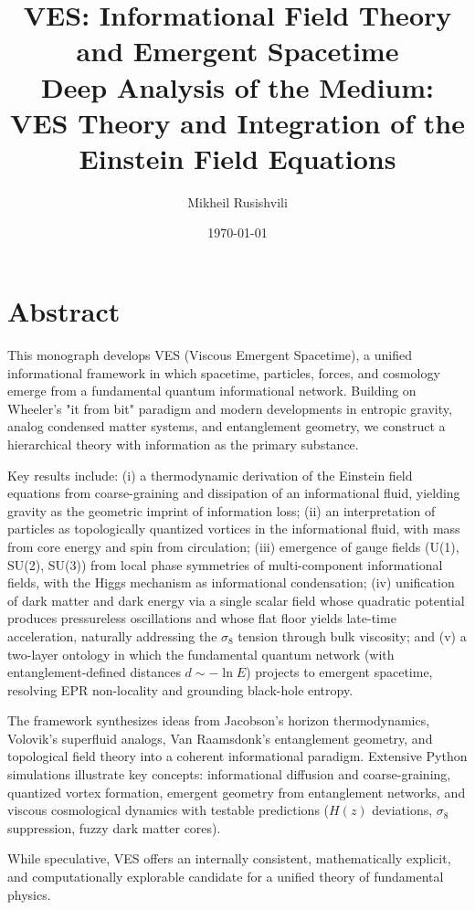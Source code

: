\documentclass[12pt,a4paper]{book}
\title{\textbf{VES: Informational Field Theory and Emergent Spacetime} \\[0.5cm] \large Deep Analysis of the Medium: VES Theory and Integration of the Einstein Field Equations}
\author{Mikheil Rusishvili}
\date{\today}
\begin{document}
\maketitle

\chapter*{Abstract}

This monograph develops VES (Viscous Emergent Spacetime), a unified informational framework in which spacetime, particles, forces, and cosmology emerge from a fundamental quantum informational network. Building on Wheeler's "it from bit" paradigm and modern developments in entropic gravity, analog condensed matter systems, and entanglement geometry, we construct a hierarchical theory with information as the primary substance.

Key results include: (i) a thermodynamic derivation of the Einstein field equations from coarse-graining and dissipation of an informational fluid, yielding gravity as the geometric imprint of information loss; (ii) an interpretation of particles as topologically quantized vortices in the informational fluid, with mass from core energy and spin from circulation; (iii) emergence of gauge fields (U(1), SU(2), SU(3)) from local phase symmetries of multi-component informational fields, with the Higgs mechanism as informational condensation; (iv) unification of dark matter and dark energy via a single scalar field whose quadratic potential produces pressureless oscillations and whose flat floor yields late-time acceleration, naturally addressing the $\sigma_8$ tension through bulk viscosity; and (v) a two-layer ontology in which the fundamental quantum network (with entanglement-defined distances $d \sim -\ln E$) projects to emergent spacetime, resolving EPR non-locality and grounding black-hole entropy.

The framework synthesizes ideas from Jacobson's horizon thermodynamics, Volovik's superfluid analogs, Van Raamsdonk's entanglement geometry, and topological field theory into a coherent informational paradigm. Extensive Python simulations illustrate key concepts: informational diffusion and coarse-graining, quantized vortex formation, emergent geometry from entanglement networks, and viscous cosmological dynamics with testable predictions ($H(z)$ deviations, $\sigma_8$ suppression, fuzzy dark matter cores).

While speculative, VES offers an internally consistent, mathematically explicit, and computationally explorable candidate for a unified theory of fundamental physics.
\end{document}
